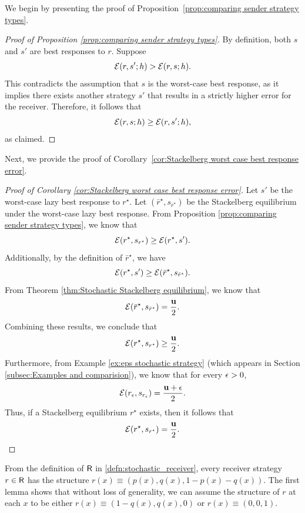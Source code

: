 We begin by presenting the proof of Proposition~\ref{prop:comparing sender strategy types}.

\begin{proof}[Proof of Proposition \ref{prop:comparing sender strategy types}]\label{proof:comparing_sender_types}
    By definition, both $s$ and $s'$ are best responses to $r$. Suppose
    \[
    \mathcal{E}(r, s'; h) > \mathcal{E}(r, s; h).
    \]
    This contradicts the assumption that $s$ is the worst-case best response, as it implies there exists another strategy $s'$ that results in a strictly higher error for the receiver.
    Therefore, it follows that
    \[
    \mathcal{E}(r, s; h) \geq \mathcal{E}(r, s'; h),
    \]
    as claimed.
\end{proof}

Next, we provide the proof of Corollary~\ref{cor:Stackelberg worst case best response error}.

\begin{proof}[Proof of Corollary \ref{cor:Stackelberg worst case best response error}]\label{proof:Stackelberg worst case best response error}
    Let $s'$ be the worst-case lazy best response to $r^\star$. Let $(\bar{r}^\star, s_{\bar{r}^\star})$ be the Stackelberg equilibrium under the worst-case lazy best response.
    From Proposition \ref{prop:comparing sender strategy types}, we know that
    \[
    \mathcal{E}(r^\star, s_{r^\star}) \geq \mathcal{E}(r^\star, s').
    \]
    Additionally, by the definition of $\bar{r}^\star$, we have
    \[
    \mathcal{E}(r^\star, s') \geq \mathcal{E}(\bar{r}^\star, s_{\bar{r}^\star}).
    \]
    From Theorem \ref{thm:Stochastic Stackelberg equilibrium}, we know that
    \[
    \mathcal{E}(\bar{r}^\star, s_{\bar{r}^\star}) = \frac{\mathbf{u}}{2}.
    \]
    Combining these results, we conclude that
    \[
    \mathcal{E}(r^\star, s_{r^\star}) \geq \frac{\mathbf{u}}{2}.
    \]
    Furthermore, from Example \ref{ex:eps stochastic strategy} (which appears in Section \ref{subsec:Examples and comparision}), we know that for every $\epsilon > 0$,
    \[
    \mathcal{E}(r_\epsilon,s_{r_\epsilon}) = \frac{\mathbf{u} + \epsilon}{2}.
    \]
    Thus, if a Stackelberg equilibrium $r^\star$ exists, then it follows that
    \[
    \mathcal{E}(r^\star,s_{r^\star}) = \frac{\mathbf{u}}{2}.
    \]
\end{proof}

From the definition of $\mathsf{R}$ in \eqref{defn:stochastic_receiver}, every receiver strategy $r \in \mathsf{R}$ has the structure $r(x) \equiv (p(x),q(x),1-p(x)-q(x))$. The first lemma shows that without loss of generality, we can assume the structure of $r$ at each $x$ to be either $r(x) \equiv (1-q(x),q(x),0)$ or $r(x) \equiv (0,0,1)$.


